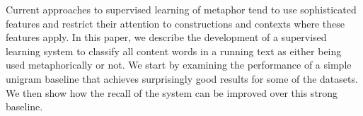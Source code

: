 Current approaches to supervised learning of metaphor tend to use sophisticated features and restrict their attention to constructions and contexts where these features apply. In this paper, we describe the development of a supervised learning system to classify all content words in a running text as either being used metaphorically or not. We start by examining the performance of a simple unigram baseline that achieves surprisingly good results for some of the datasets. We then show how the recall of the system can be improved over this strong baseline.

